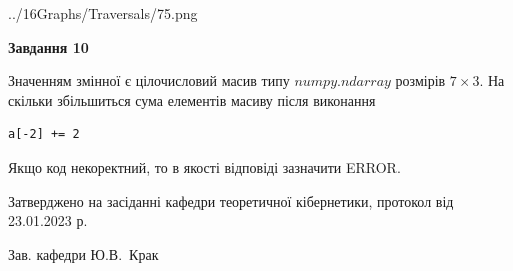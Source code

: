 \documentclass[12pt, ukrainian]{article}
\begin{document}
{\begin {large}
\begin{center}
	{../16Graphs/Traversals/75.png}
\end{center}\par
\newpage

{\begin {center}\textbf{Завдання 10}\end {center}}\par
Значенням змінної  є цілочисловий масив типу $numpy.ndarray$ розмірів $7{\times}3$. На скільки збільшиться сума елементів масиву  після виконання
\begin{verbatim}
a[-2] += 2
\end{verbatim}


Якщо код некоректний, то в якості відповіді зазначити ERROR.\par
\newpage


\end {large}
}
{\smallskip \begin {small} Затверджено на засіданні кафедри теоретичної кібернетики, протокол  від   23.01.2023 р.\par\smallskip\smallskip
{\parbox {6.5 cm}{Зав. кафедри \dotfill Ю.В.~Крак}} \end{small}}
\end{document}
